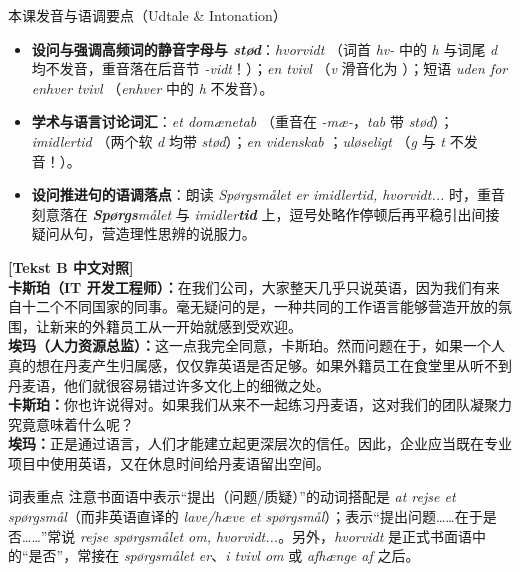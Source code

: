 \begin{tipbox}{本课发音与语调要点（Udtale \& Intonation）}
\begin{itemize}
  \item \textbf{设问与强调高频词的静音字母与 \textit{stød}}：\textit{hvorvidt} （词首 \textit{hv-} 中的 \textit{h} 与词尾 \textit{d} 均不发音，重音落在后音节 \textit{-vidt}！）；\textit{en tvivl} （\textit{v} 滑音化为 ）；短语 \textit{uden for enhver tvivl} （\textit{enhver} 中的 \textit{h} 不发音）。
  \item \textbf{学术与语言讨论词汇}：\textit{et domænetab} （重音在 \textit{-mæ-}，\textit{tab} 带 \textit{stød}）；\textit{imidlertid} （两个软 \textit{d} 均带 \textit{stød}）；\textit{en videnskab} ；\textit{uløseligt} （\textit{g} 与 \textit{t} 不发音！）。
  \item \textbf{设问推进句的语调落点}：朗读 \textit{Spørgsmålet er imidlertid, hvorvidt...} 时，重音刻意落在 \textit{\textbf{Spørgs}målet} 与 \textit{imidler\textbf{tid}} 上，逗号处略作停顿后再平稳引出间接疑问从句，营造理性思辨的说服力。
\end{itemize}
\end{tipbox}

\begin{transbox}
\small
\textbf{\color{NCDTeal}[Tekst B 中文对照]}\\
\textbf{卡斯珀（IT 开发工程师）：}在我们公司，大家整天几乎只说英语，因为我们有来自十二个不同国家的同事。毫无疑问的是，一种共同的工作语言能够营造开放的氛围，让新来的外籍员工从一开始就感到受欢迎。\\
\textbf{埃玛（人力资源总监）：}这一点我完全同意，卡斯珀。然而问题在于，如果一个人真的想在丹麦产生归属感，仅仅靠英语是否足够。如果外籍员工在食堂里从听不到丹麦语，他们就很容易错过许多文化上的细微之处。\\
\textbf{卡斯珀：}你也许说得对。如果我们从来不一起练习丹麦语，这对我们的团队凝聚力究竟意味着什么呢？\\
\textbf{埃玛：}正是通过语言，人们才能建立起更深层次的信任。因此，企业应当既在专业项目中使用英语，又在休息时间给丹麦语留出空间。
\end{transbox}


\begin{tipbox}{词表重点}
注意书面语中表示“提出（问题/质疑）”的动词搭配是 \textit{at rejse et spørgsmål}（而非英语直译的 \textit{lave/hæve et spørgsmål}）；表示“提出问题……在于是否……”常说 \textit{rejse spørgsmålet om, hvorvidt...}。另外，\textit{hvorvidt} 是正式书面语中的“是否”，常接在 \textit{spørgsmålet er}、\textit{i tvivl om} 或 \textit{afhænge af} 之后。
\end{tipbox}

